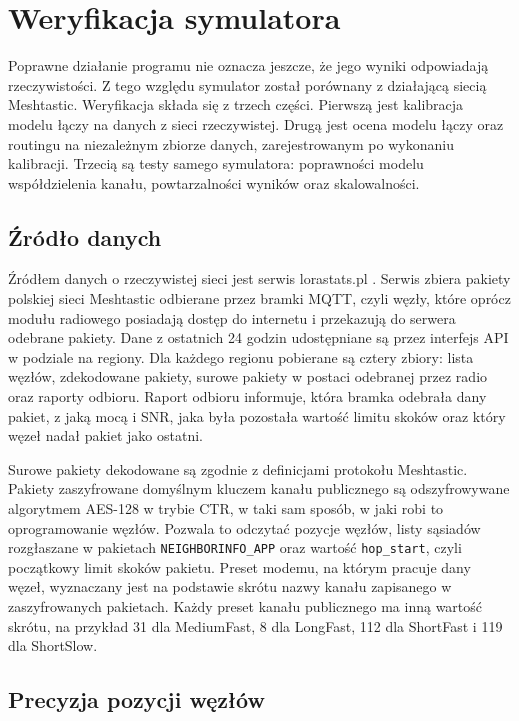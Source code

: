 \chapter{Weryfikacja symulatora}
\label{chap:weryfikacja}

Poprawne działanie programu nie oznacza jeszcze, że jego wyniki odpowiadają rzeczywistości. Z tego względu symulator został porównany z działającą siecią Meshtastic. Weryfikacja składa się z trzech części. Pierwszą jest kalibracja modelu łączy na danych z sieci rzeczywistej. Drugą jest ocena modelu łączy oraz routingu na niezależnym zbiorze danych, zarejestrowanym po wykonaniu kalibracji. Trzecią są testy samego symulatora: poprawności modelu współdzielenia kanału, powtarzalności wyników oraz skalowalności.

\section{Źródło danych}

Źródłem danych o rzeczywistej sieci jest serwis lorastats.pl \cite{lorastats}. Serwis zbiera pakiety polskiej sieci Meshtastic odbierane przez bramki MQTT, czyli węzły, które oprócz modułu radiowego posiadają dostęp do internetu i przekazują do serwera odebrane pakiety. Dane z ostatnich 24 godzin udostępniane są przez interfejs API w podziale na regiony. Dla każdego regionu pobierane są cztery zbiory: lista węzłów, zdekodowane pakiety, surowe pakiety w postaci odebranej przez radio oraz raporty odbioru. Raport odbioru informuje, która bramka odebrała dany pakiet, z jaką mocą i SNR, jaka była pozostała wartość limitu skoków oraz który węzeł nadał pakiet jako ostatni.

Surowe pakiety dekodowane są zgodnie z definicjami protokołu Meshtastic. Pakiety zaszyfrowane domyślnym kluczem kanału publicznego są odszyfrowywane algorytmem AES-128 w trybie CTR, w taki sam sposób, w jaki robi to oprogramowanie węzłów. Pozwala to odczytać pozycje węzłów, listy sąsiadów rozgłaszane w pakietach \texttt{NEIGHBORINFO\_APP} oraz wartość \texttt{hop\_start}, czyli początkowy limit skoków pakietu. Preset modemu, na którym pracuje dany węzeł, wyznaczany jest na podstawie skrótu nazwy kanału zapisanego w zaszyfrowanych pakietach. Każdy preset kanału publicznego ma inną wartość skrótu, na przykład 31 dla MediumFast, 8 dla LongFast, 112 dla ShortFast i 119 dla ShortSlow.

\section{Precyzja pozycji węzłów}

